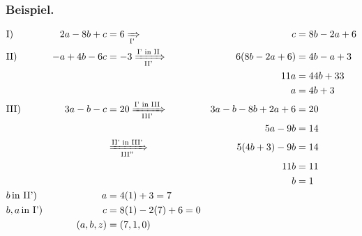 \documentclass{report}
\theoremstyle{definition}
\theoremstyle{definition}
\theoremstyle{an}
\theoremstyle{lem}
\theoremstyle{def}
\theoremstyle{def}
\begin{document}
	\subsubsection*{\textsf{Beispiel.}}
	\begin{align*}
		&\text{I)}& 2a-8b+c&=6 \xRightarrow[\text{I'}]{}& c&=8b-2a+6 \\
		&\text{II)}& -a+4b-6c&=-3 \xRightarrow[\text{II'}]{\text{I' in II}}& 6(8b-2a+6)&=4b-a+3 \\
		&&&&11a&=44b+33 \\
		&&&&a&=4b+3\\
		&\text{III)}& 3a-b-c&=20 \xRightarrow[\text{III'}]{\text{I' in III}}& 3a-b-8b+2a+6&=20 \\ 
		&&&&5a-9b&=14 \\
		&&&\xRightarrow[\text{III''}]{\text{II' in III'}}& 5(4b+3)-9b&=14 \\
		&&&&11b&=11 \\
		&&&&b&=1 \\
		&b\, \text{in II')}& a&=4(1)+3=7\\
		&b,a \, \text{in I')}& c&=8(1)-2(7)+6=0 \\
		&&(a,b,z)&=(7,1,0)
	\end{align*}
\end{document}
